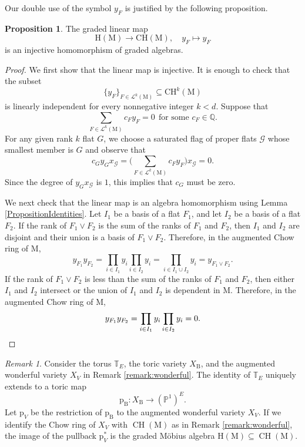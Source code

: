 \documentclass[11pt,reqno]{amsart}
\theoremstyle{definition}
\newtheorem{proposition}[theorem]{Proposition}
\theoremstyle{remark}
\newtheorem{remark}[theorem]{Remark}
\renewcommand{\(}{\left(}
\renewcommand{\)}{\right)}
\newcommand{\<}{\left<}
\renewcommand{\>}{\right>}
\newcommand{\CH}{\operatorname{CH}}
\begin{document}
Our double use of the symbol $y_F$ is justified by the following proposition.

\begin{proposition}\label{PropositionMobiusAlgebra}
The graded linear map
\[
\mathrm{H}(\mathrm{M} ) \longrightarrow \mathrm{CH}(\mathrm{M}), \quad y_F \longmapsto y_F
\]
is an injective homomorphism of graded algebras.
\end{proposition}

\begin{proof}
We first show that the linear map is injective.
It is enough to check that the subset
\[
\{y_F\}_{F \in \mathscr{L}^k(\mathrm{M})} \subseteq \mathrm{CH}^k(\mathrm{M})
\]
is linearly independent for every nonnegative integer $k<d$.
Suppose that
\[
\sum_{F \in \mathscr{L}^k(\mathrm{M})}  c_F y_F=0 \ \ \text{for some $c_F \in \mathbb{Q}$}.
\]
For any given rank $k$ flat $G$, we choose a saturated flag of proper flats $\mathscr{G}$ whose smallest member is $G$
and observe that
\[
c_G y_G x_\mathscr{G} = \Big(\sum_{F \in \mathscr{L}^k(\mathrm{M})}  c_F y_F\Big) x_\mathscr{G} =0.
\]
Since the degree of  $y_Gx_\mathscr{G} $ is $1$, this implies that $c_G$ must be zero.

We next check that the linear map is an algebra homomorphism using Lemma \ref{PropositionIdentities}.
Let $I_1$  be a basis of a flat $F_1$, and let $I_2$ be a basis of a flat $F_2$.
If the rank of $F_1 \lor F_2$ is the sum of the ranks of $F_1$ and $F_2$,
then $I_1$ and $I_2$ are disjoint and their union is a basis of $F_1 \lor F_2$.
Therefore, in the augmented Chow ring of $\mathrm{M}$,  
\[
y_{F_1}y_{F_2}=\prod_{i \in I_1} y_i \prod_{i \in I_2} y_i =\prod_{i \in I_1 \cup I_2} y_i=y_{F_1 \lor F_2}.
\]
If the rank of $F_1 \lor F_2$ is less than the sum of the ranks of $F_1$ and $F_2$,
then either $I_1$ and $I_2$ intersect or the union of $I_1$ and $I_2$ is dependent in $\mathrm{M}$.
Therefore, in the augmented Chow ring of $\mathrm{M}$,  
\[
y_{F_1}y_{F_2}=\prod_{i \in I_1} y_i \prod_{i \in I_2} y_i =0.
\qedhere
\]
\end{proof}


\begin{remark}
Consider the torus $\mathbb{T}_E$, the  toric variety $X_\mathrm{B}$, and 
the augmented wonderful variety $X_V$ in Remark \ref{remark:wonderful}.
The identity of $\mathbb{T}_E$ uniquely extends to a toric map 
\[
\mathrm{p}_\mathrm{B}: X_\mathrm{B} \longrightarrow (\mathbb{P}^1)^E.
\]
Let $\mathrm{p}_V$ be the restriction of $\mathrm{p}_\mathrm{B}$ to the augmented wonderful variety $X_V$.
If we identify  the Chow ring of $X_V$ with $\CH(\mathrm{M})$  as in Remark \ref{remark:wonderful},
 the image of the pullback $\mathrm{p}_V^*$ is
  the graded M\"obius algebra $\mathrm{H}(\mathrm{M}) \subseteq \CH(\mathrm{M})$.
  \end{remark}
\end{document}
